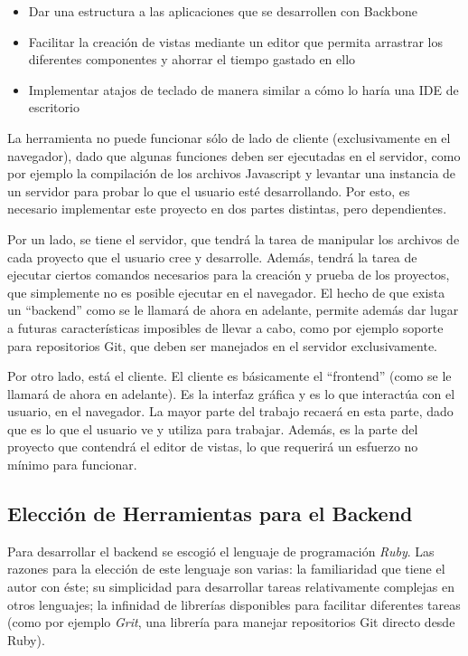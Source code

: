 \documentclass[12pt,titlepage,]{article}
\begin{document}
\begin{itemize}
\item
  Dar una estructura a las aplicaciones que se desarrollen con Backbone
\item
  Facilitar la creación de vistas mediante un editor que permita
  arrastrar los diferentes componentes y ahorrar el tiempo gastado en
  ello
\item
  Implementar atajos de teclado de manera similar a cómo lo haría una
  IDE de escritorio
\end{itemize}

La herramienta no puede funcionar sólo de lado de cliente
(exclusivamente en el navegador), dado que algunas funciones deben ser
ejecutadas en el servidor, como por ejemplo la compilación de los
archivos Javascript y levantar una instancia de un servidor para probar
lo que el usuario esté desarrollando. Por esto, es necesario implementar
este proyecto en dos partes distintas, pero dependientes.

Por un lado, se tiene el servidor, que tendrá la tarea de manipular los
archivos de cada proyecto que el usuario cree y desarrolle. Además,
tendrá la tarea de ejecutar ciertos comandos necesarios para la creación
y prueba de los proyectos, que simplemente no es posible ejecutar en el
navegador. El hecho de que exista un ``backend'' como se le llamará de
ahora en adelante, permite además dar lugar a futuras características
imposibles de llevar a cabo, como por ejemplo soporte para repositorios
Git, que deben ser manejados en el servidor exclusivamente.

Por otro lado, está el cliente. El cliente es básicamente el
``frontend'' (como se le llamará de ahora en adelante). Es la interfaz
gráfica y es lo que interactúa con el usuario, en el navegador. La mayor
parte del trabajo recaerá en esta parte, dado que es lo que el usuario
ve y utiliza para trabajar. Además, es la parte del proyecto que
contendrá el editor de vistas, lo que requerirá un esfuerzo no mínimo
para funcionar.

\subsection{Elección de Herramientas para el Backend}

Para desarrollar el backend se escogió el lenguaje de programación
\emph{Ruby}. Las razones para la elección de este lenguaje son varias:
la familiaridad que tiene el autor con éste; su simplicidad para
desarrollar tareas relativamente complejas en otros lenguajes; la
infinidad de librerías disponibles para facilitar diferentes tareas
(como por ejemplo \emph{Grit}, una librería para manejar repositorios
Git directo desde Ruby).
\end{document}
